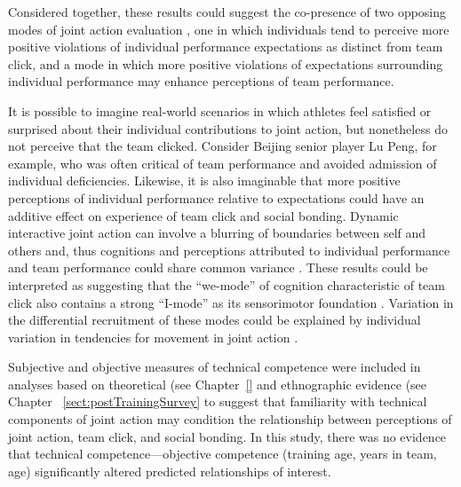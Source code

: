 \begin{CJK}{UTF8}{gbsn}
Considered together, these results could suggest the co-presence of two opposing modes of joint action evaluation \citep{Friston2015a}, one in which individuals tend to perceive more positive violations of individual performance expectations as distinct from team click, and a mode in which more positive violations of expectations surrounding individual performance may enhance perceptions of team performance.

It is possible to imagine real-world scenarios in which athletes feel satisfied or surprised about their individual contributions to joint action, but nonetheless do not perceive that the team clicked.  Consider Beijing senior player Lu Peng, for example, who was often critical of team performance and avoided admission of individual deficiencies.  Likewise, it is also imaginable that more positive perceptions of individual performance relative to expectations could have an additive effect on experience of team click and social bonding.  Dynamic interactive joint action can involve a blurring of boundaries between self and others and, thus cognitions and perceptions attributed to individual performance and team performance could share common variance \citep{Friston2015}.  These results could be interpreted as suggesting that the ``we-mode'' of cognition characteristic of team click also contains a strong ``I-mode'' as its sensorimotor foundation \citep{Gallotti2013,VanderWel2015}.  Variation in the differential recruitment of these modes could be explained by individual variation in tendencies for movement in joint action \citep{Keller2014}.




Subjective and objective measures of technical competence were included in analyses based on theoretical (see Chapter~\ref{} and ethnographic evidence (see Chapter ~\ref{sect:postTrainingSurvey} to suggest that familiarity with technical components of joint action may condition the relationship between perceptions of joint action, team click, and social bonding.  In this study, there was no evidence that technical competence---objective competence (training age, years in team, age) significantly altered predicted relationships of interest.


\end{CJK}
